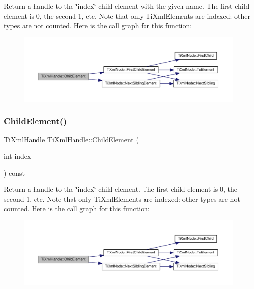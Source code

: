 Return a handle to the \char`\"{}index\char`\"{} child element with the given name. The first child element is 0, the second 1, etc. Note that only Ti\+Xml\+Elements are indexed\+: other types are not counted. Here is the call graph for this function\+:
\nopagebreak
\begin{figure}[H]
\begin{center}
\leavevmode
\includegraphics[width=350pt]{class_ti_xml_handle_afccc59d8a0daa8c5d78474fbed430ddb_cgraph}
\end{center}
\end{figure}
\mbox{\label{class_ti_xml_handle_a57a639ab0ac99ff9358f675a1b73049a}} 
\subsubsection{\texorpdfstring{Child\+Element()}{ChildElement()}\hspace{0.1cm}{\footnotesize\ttfamily [2/2]}}
{\footnotesize\ttfamily \hyperlink{class_ti_xml_handle}{Ti\+Xml\+Handle} Ti\+Xml\+Handle\+::\+Child\+Element (\begin{DoxyParamCaption}\item[{int}]{index }\end{DoxyParamCaption}) const}

Return a handle to the \char`\"{}index\char`\"{} child element. The first child element is 0, the second 1, etc. Note that only Ti\+Xml\+Elements are indexed\+: other types are not counted. Here is the call graph for this function\+:
\nopagebreak
\begin{figure}[H]
\begin{center}
\leavevmode
\includegraphics[width=350pt]{class_ti_xml_handle_a57a639ab0ac99ff9358f675a1b73049a_cgraph}
\end{center}
\end{figure}
\mbox{\label{class_ti_xml_handle_ae9b22d71bf5f69ee5fda28f5ad21f19c}} 
